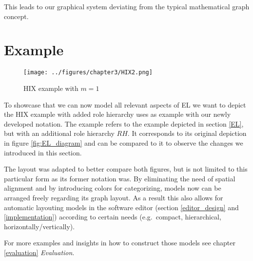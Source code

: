 \documentclass[twoside, openright, 12pt]{book}
\begin{document}
This leads to our graphical system deviating from the typical mathematical graph concept.



\section{Example}
\label{gsl_example}

\begin{figure}[htb]
	\centering
	\texttt{[image: ../figures/chapter3/HIX2.png]}
	\caption{HIX example with $m=1$ \citep{Amthor18}}
	\label{fig:HIX2}
\end{figure}

\noindent
To showcase that we can now model all relevant aspects of EL we want to depict the HIX example with added role hierarchy \cite{Amthor18} uses as example with our newly developed notation.
The example refers to the example depicted in section \ref{EL}, but with an additional role hierarchy $RH$.
It corresponds to its original depiction in figure \ref{fig:EL_diagram} and can be compared to it to observe the changes we introduced in this section.

The layout was adapted to better compare both figures, but is not limited to this particular form as its former notation was.
By eliminating the need of spatial alignment and by introducing colors for categorizing, models now can be arranged freely regarding its graph layout.
As a result this also allows for automatic layouting models in the software editor (section \ref{editor_design} and \ref{implementation}) according to certain needs (e.g.~compact, hierarchical, horizontally/vertically).

For more examples and insights in how to construct those models see chapter \ref{evaluation} \textit{Evaluation}.

\end{document}
